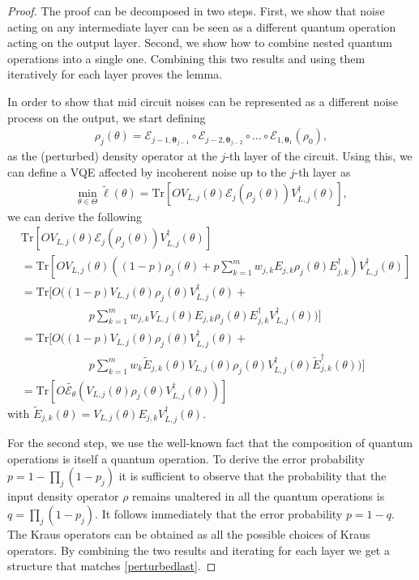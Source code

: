 \documentclass[letterpaper, 10 pt]{IEEEtran}  %
\newcommand{\Tr}{\mathrm{Tr}}
\begin{document}
\begin{proof}
The proof can be decomposed in two steps.
First, we show that noise acting on any intermediate layer can be seen as a different quantum operation acting on the 
output layer.
Second, we show how to combine nested quantum operations into a single one. 
Combining this two results and using them iteratively for each layer proves the lemma. 

In order to show that mid circuit noises can be represented as a different noise process on the output,
we start defining 
\begin{align}
   \rho_j(\theta)=\mathcal{E}_{j-1,\mathbf{\theta}_{j-1}} \circ \mathcal{E}_{j-2,\mathbf{\theta}_{j-2}} \circ \dots \circ \mathcal{E}_{1,\mathbf{\theta}_1} (\rho_0), 
\end{align}
as the (perturbed) density operator at the $j$-th layer of the circuit. 
Using this, we can define a VQE affected by incoherent noise up to the $j$-th layer as 
\begin{align}
    \min_{\theta \in \Theta} \tilde{\ell} (\theta) = \Tr[O V_{L,j}(\theta) \mathcal{E}_j(\rho_j(\theta))V_{L,j}^\dagger (\theta)],
\end{align}
we can derive the following
\begin{align}
    & \Tr[O V_{L,j}(\theta) \mathcal{E}_j(\rho_j(\theta))V_{L,j}^\dagger (\theta)] \nonumber \\
    & = \Tr[O V_{L,j}(\theta) ((1-p)\rho_j(\theta) + \nonumber p \sum_{k=1}^{m} w_{j,k} E_{j,k} \rho_j(\theta) E^\dagger_{j,k}) V_{L,j}^\dagger (\theta)] \nonumber \\
    & = \Tr[O ((1-p)V_{L,j}(\theta)\rho_j(\theta) V_{L,j}^\dagger (\theta) +  \nonumber \\
    & \quad \quad \quad \quad \quad \quad p \sum_{k=1}^{m} w_{j,k} V_{L,j}(\theta)E_{j,k} \rho_j(\theta) E^\dagger_{j,k}V_{L,j}^\dagger (\theta))]  \nonumber \\
    & = \Tr[O ((1-p)V_{L,j}(\theta)\rho_j(\theta) V_{L,j}^\dagger (\theta) + \nonumber \\
    & \quad \quad \quad \quad \quad \quad p \sum_{k=1}^{m} w_k \tilde{E}_{j,k}(\theta)V_{L,j}(\theta)\rho_j(\theta) V_{L,j}^\dagger (\theta)\tilde{E}^\dagger_{j,k}(\theta))] \nonumber \\
    & = \Tr[O \tilde{\mathcal{E}_\theta}(V_{L,j}(\theta) \rho_j(\theta) V_{L,j}^\dagger (\theta))]    
\end{align}
with $\tilde{E}_{j,k}(\theta) = V_{L,j}(\theta)E_{j,k} V_{L,j}^\dagger (\theta)$. 

For the second step, we use the well-known fact that the composition of quantum operations is itself a quantum operation. 
To derive the error probability $p=1-\prod_j (1-p_j)$ it is sufficient to observe that the probability that the input density operator $\rho$ 
remains unaltered in all the quantum operations is $q=\prod_j (1-p_j)$. It follows immediately that the error probability $p=1-q$.
The Kraus operators can be obtained as all the possible choices of Kraus operators.
By combining the two results and iterating for each layer we get a structure that matches \eqref{perturbedlast}.
\end{proof}
\end{document}
